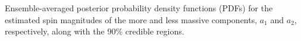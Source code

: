 \label{fig:spinPDF} Ensemble-averaged posterior probability density functions (PDFs) for the estimated spin magnitudes of the more and less massive components, $a_1$ and $a_2$, respectively, along with the 90\% credible regions.